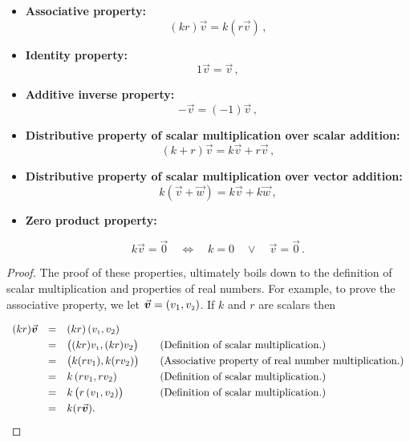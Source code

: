 \begin{itemize}

\item  \textbf{Associative property:} 
$$(kr)\vec{v} = k(r\vec{v})\,,$$

\item  \textbf{Identity property:} 
 $$1\vec{v} = \vec{v}\,,$$

\item  \textbf{Additive inverse property:} 
$$-\vec{v} = (-1)\vec{v}\,,$$

\item  \textbf{Distributive property of scalar multiplication over scalar addition:} 
 \[(k+r)\vec{v} = k\vec{v} + r\vec{v}\,,\]

\item  \textbf{Distributive property of scalar multiplication over vector addition:} 
 \[k(\vec{v}+\vec{w}) = k\vec{v} + k\vec{w}\,,\] 

\item  \textbf{Zero product property:}  

\[k\vec{v} = \vec{0} \quad \Leftrightarrow\quad k=0 \quad \vee \quad \vec{v} =\vec{0}\,.\]


\end{itemize}

\ifcourse
\ifanalysis
\begin{proof}
The proof of these properties, ultimately boils down to the definition of scalar multiplication and properties of real numbers. 
For example, to prove the associative property, we let $\vec{v} = \left(v_1,v_{\mbox{\tiny $2$}}\right)$.  If $k$ and $r$ are scalars then 

\[\begin{array}{rcll}

(kr) \vec{v} & = & (kr) \left(v_{\mbox{\tiny $1$}},v_2\right) & \\ [3pt]
						 & = &  \left((kr) v_{\mbox{\tiny $1$}}, (kr) v_2\right) & \quad\text{(Definition of scalar multiplication.)} \\ [3pt]
						 & = &   \left(k (r v_1),  k (r v_2)\right) & \quad\text{(Associative property of real number multiplication.)} \\ [3pt]
						 & = &   k\left(r v_1,  r v_2\right) & \quad\text{(Definition of scalar multiplication.)} \\ [3pt]	
 						 & = &   k\left(r\left(v_1, v_2\right)\right) & \quad\text{(Definition of scalar multiplication.)} \\ [3pt]
						 & = & k(r\vec{v}). & \\ \end{array} \]
\end{proof}
\fi

